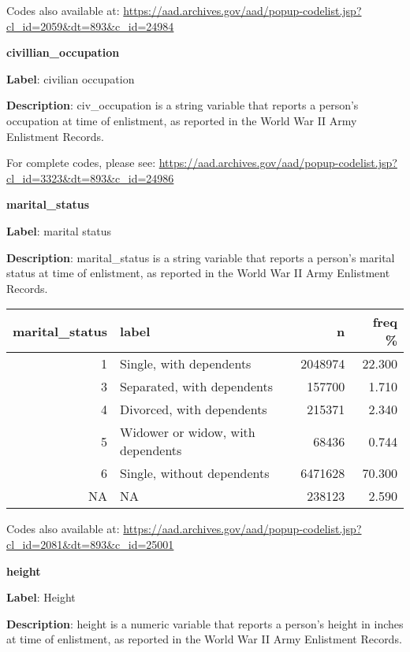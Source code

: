 \documentclass[
]{article}
\begin{document}
Codes also available at:
\url{https://aad.archives.gov/aad/popup-codelist.jsp?cl_id=2059\&dt=893\&c_id=24984}

\newpage

\textbf{\huge civillian\_occupation} \normalsize \vspace{12pt}

\textbf{Label}: civilian occupation

\textbf{Description}: civ\_occupation is a string variable that reports
a person's occupation at time of enlistment, as reported in the World
War II Army Enlistment Records.

For complete codes, please see:
\url{https://aad.archives.gov/aad/popup-codelist.jsp?cl_id=3323\&dt=893\&c_id=24986}

\newpage

\textbf{\huge marital\_status} \normalsize \vspace{12pt}

\textbf{Label}: marital status

\textbf{Description}: marital\_status is a string variable that reports
a person's marital status at time of enlistment, as reported in the
World War II Army Enlistment Records.

\vspace{30pt}

\begin{longtable}[]{@{}rlrr@{}}
\toprule()
marital\_status & label & n & freq \% \\
\midrule()
\endhead
1 & Single, with dependents & 2048974 & 22.300 \\
3 & Separated, with dependents & 157700 & 1.710 \\
4 & Divorced, with dependents & 215371 & 2.340 \\
5 & Widower or widow, with dependents & 68436 & 0.744 \\
6 & Single, without dependents & 6471628 & 70.300 \\
NA & NA & 238123 & 2.590 \\
\bottomrule()
\end{longtable}

Codes also available at:
\url{https://aad.archives.gov/aad/popup-codelist.jsp?cl_id=2081\&dt=893\&c_id=25001}

\newpage

\textbf{\huge height} \normalsize \vspace{12pt}

\textbf{Label}: Height

\textbf{Description}: height is a numeric variable that reports a
person's height in inches at time of enlistment, as reported in the
World War II Army Enlistment Records.
\end{document}
